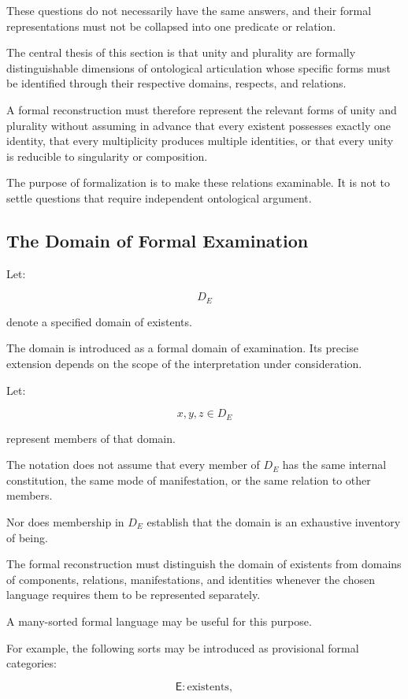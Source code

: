 These questions do not necessarily have the same
answers, and their formal representations must
not be collapsed into one predicate or relation.

The central thesis of this section is that unity
and plurality are formally distinguishable
dimensions of ontological articulation whose
specific forms must be identified through their
respective domains, respects, and relations.

A formal reconstruction must therefore represent
the relevant forms of unity and plurality without
assuming in advance that every existent possesses
exactly one identity, that every multiplicity
produces multiple identities, or that every unity
is reducible to singularity or composition.

The purpose of formalization is to make these
relations examinable. It is not to settle questions
that require independent ontological argument.

\subsection{The Domain of Formal Examination}

Let:

\[
    D_E
\]

denote a specified domain of existents.

The domain is introduced as a formal domain of
examination. Its precise extension depends on the
scope of the interpretation under consideration.

Let:

\[
    x,y,z \in D_E
\]

represent members of that domain.

The notation does not assume that every member
of \(D_E\) has the same internal constitution,
the same mode of manifestation, or the same
relation to other members.

Nor does membership in \(D_E\) establish that
the domain is an exhaustive inventory of being.

The formal reconstruction must distinguish the
domain of existents from domains of components,
relations, manifestations, and identities whenever
the chosen language requires them to be represented
separately.

A many-sorted formal language may be useful for
this purpose.

For example, the following sorts may be introduced
as provisional formal categories:

\[
    \mathsf{E}:
    \text{existents},
\]

